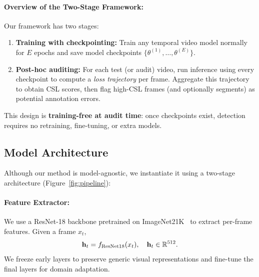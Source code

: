 \documentclass{article}
\theoremstyle{plain}
\theoremstyle{definition}
\theoremstyle{remark}
\begin{document}
\vspace{-0.6em}
\paragraph{Overview of the Two-Stage Framework:}
\vspace{-0.5em}
Our framework has two stages:
\vspace{-0.5em}
\begin{enumerate}[leftmargin=*]
    \item \textbf{Training with checkpointing:} Train any temporal video model normally for $E$ epochs and save model checkpoints $\{\theta^{(1)},\dots,\theta^{(E)}\}$.
    \vspace{-0.5em}
    \item \textbf{Post-hoc auditing:} For each test (or audit) video, run inference using every checkpoint to compute a \emph{loss trajectory} per frame. Aggregate this trajectory to obtain CSL scores, then flag high-CSL frames (and optionally segments) as potential annotation errors.
\end{enumerate}
\vspace{-1em}
This design is \textbf{training-free at audit time}: once checkpoints exist, detection requires no retraining, fine-tuning, or extra models.

\vspace{-0.4em}
\subsection{Model Architecture}
\label{subsec:architecture}
Although our method is model-agnostic, we instantiate it using a two-stage architecture (Figure~\ref{fig:pipeline}):

\vspace{-0.4em}
\paragraph{Feature Extractor:}
We use a ResNet-18 backbone pretrained on ImageNet21K~\cite{image_net} to extract per-frame features. Given a frame $x_t$,
\vspace{-0.4em}
\begin{equation}
\mathbf{h}_t = f_{\text{ResNet18}}(x_t), \quad \mathbf{h}_t \in \mathbb{R}^{512}.
\vspace{-0.4em}
\end{equation}
We freeze early layers to preserve generic visual representations and fine-tune the final layers for domain adaptation.
\end{document}
